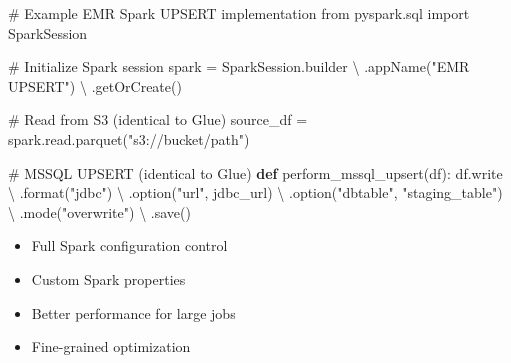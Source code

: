 \documentclass[
  letterpaper,
  DIV=11,
  numbers=noendperiod]{scrartcl}
\newenvironment{Shaded}{\begin{snugshade}}{\end{snugshade}}
\newcommand{\BuiltInTok}[1]{\textcolor[rgb]{0.00,0.23,0.31}{#1}}
\newcommand{\CommentTok}[1]{\textcolor[rgb]{0.37,0.37,0.37}{#1}}
\newcommand{\ImportTok}[1]{\textcolor[rgb]{0.00,0.46,0.62}{#1}}
\newcommand{\KeywordTok}[1]{\textcolor[rgb]{0.00,0.23,0.31}{\textbf{#1}}}
\newcommand{\NormalTok}[1]{\textcolor[rgb]{0.00,0.23,0.31}{#1}}
\newcommand{\OperatorTok}[1]{\textcolor[rgb]{0.37,0.37,0.37}{#1}}
\newcommand{\StringTok}[1]{\textcolor[rgb]{0.13,0.47,0.30}{#1}}
\providecommand{\tightlist}{%
  \setlength{\itemsep}{0pt}\setlength{\parskip}{0pt}}\usepackage{longtable,booktabs,array}
\begin{document}
\begin{Shaded}
\begin{Highlighting}[]
\CommentTok{\# Example EMR Spark UPSERT implementation}
\ImportTok{from}\NormalTok{ pyspark.sql }\ImportTok{import}\NormalTok{ SparkSession}

\CommentTok{\# Initialize Spark session}
\NormalTok{spark }\OperatorTok{=}\NormalTok{ SparkSession.builder }\OperatorTok{\textbackslash{}}
\NormalTok{    .appName(}\StringTok{"EMR UPSERT"}\NormalTok{) }\OperatorTok{\textbackslash{}}
\NormalTok{    .getOrCreate()}

\CommentTok{\# Read from S3 (identical to Glue)}
\NormalTok{source\_df }\OperatorTok{=}\NormalTok{ spark.read.parquet(}\StringTok{"s3://bucket/path"}\NormalTok{)}

\CommentTok{\# MSSQL UPSERT (identical to Glue)}
\KeywordTok{def}\NormalTok{ perform\_mssql\_upsert(df):}
\NormalTok{    df.write }\OperatorTok{\textbackslash{}}
\NormalTok{        .}\BuiltInTok{format}\NormalTok{(}\StringTok{"jdbc"}\NormalTok{) }\OperatorTok{\textbackslash{}}
\NormalTok{        .option(}\StringTok{"url"}\NormalTok{, jdbc\_url) }\OperatorTok{\textbackslash{}}
\NormalTok{        .option(}\StringTok{"dbtable"}\NormalTok{, }\StringTok{"staging\_table"}\NormalTok{) }\OperatorTok{\textbackslash{}}
\NormalTok{        .mode(}\StringTok{"overwrite"}\NormalTok{) }\OperatorTok{\textbackslash{}}
\NormalTok{        .save()}
\end{Highlighting}
\end{Shaded}

\begin{tcolorbox}[enhanced jigsaw, colbacktitle=quarto-callout-tip-color!10!white, coltitle=black, toprule=.15mm, colback=white, bottomrule=.15mm, colframe=quarto-callout-tip-color-frame, left=2mm, leftrule=.75mm, opacityback=0, toptitle=1mm, opacitybacktitle=0.6, bottomtitle=1mm, titlerule=0mm, rightrule=.15mm, title=\textcolor{quarto-callout-tip-color}{\faLightbulb}\hspace{0.5em}{EMR Performance Strengths}, breakable, arc=.35mm]

\begin{itemize}
\tightlist
\item
  Full Spark configuration control
\item
  Custom Spark properties
\item
  Better performance for large jobs
\item
  Fine-grained optimization
\end{itemize}

\end{tcolorbox}
\end{document}
